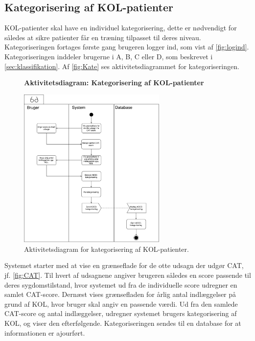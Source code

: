 \subsection*{Kategorisering af KOL-patienter} \label{sec:kategorisering}
KOL-patienter skal have en individuel kategorisering, dette er nødvendigt for således at sikre patienter får en træning tilpasset til deres niveau. Kategoriseringen fortages første gang brugeren logger ind, som vist af \autoref{fig:logind}. 
Kategoriseringen inddeler brugerne i A, B, C eller D, som beskrevet i \autoref{sec:klassifikation}. Af \autoref{fig:Kate} ses aktivitetsdiagrammet for kategoriseringen.

\begin{figure} [H]
\centering
\textbf{Aktivitetsdiagram: Kategorisering af KOL-patienter}\par\medskip
\includegraphics[width=0.65\textwidth]{figures/aktivitetsdiagram/Kategorisering}
\caption{Aktivitetsdiagram for kategorisering af KOL-patienter.}
\label{fig:Kate}
\end{figure}

\noindent
Systemet starter med at vise en grænseflade for de otte udsagn der udgør CAT, jf. \autoref{fig:CAT}. Til hvert af udsagnene angiver brugeren således en score passende til deres sygdomstilstand, hvor systemet ud fra de individuelle score udregner en samlet CAT-score. 
Dernæst vises grænsefladen for årlig antal indlæggelser på grund af KOL, hvor bruger skal angiv en passende værdi. 
Ud fra den samlede CAT-score og antal indlæggelser, udregner systemet brugers kategorisering af KOL, og viser den efterfølgende. Kategoriseringen sendes til en database for at informationen er ajourført.